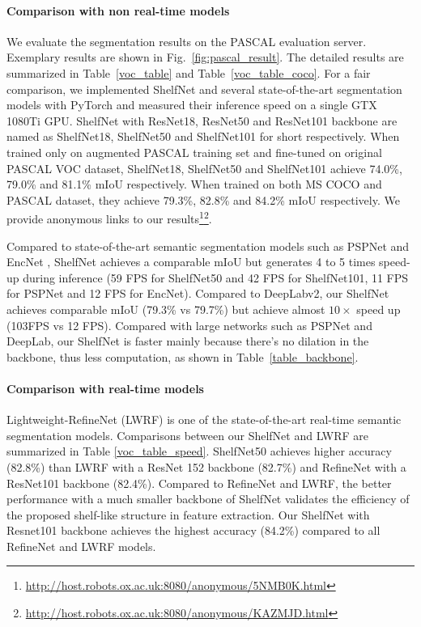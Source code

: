\documentclass[10pt,twocolumn,letterpaper]{article}
\begin{document}
\paragraph{Comparison with non real-time models}
We evaluate the segmentation results on the PASCAL evaluation server. Exemplary results are shown in Fig.~\ref{fig:pascal_result}. The detailed results are summarized in Table~\ref{voc_table} and Table~\ref{voc_table_coco}. For a fair comparison, we implemented ShelfNet and several state-of-the-art segmentation models with PyTorch and measured their inference speed on a single GTX 1080Ti GPU. ShelfNet with ResNet18, ResNet50 and ResNet101 backbone are named as ShelfNet18, ShelfNet50 and ShelfNet101 for short respectively. When trained only on augmented PASCAL training set and fine-tuned on original PASCAL VOC dataset, ShelfNet18, ShelfNet50 and ShelfNet101 achieve 74.0\%, 79.0\% and 81.1\% mIoU respectively. When trained on both MS COCO and PASCAL dataset,  they achieve 79.3\%, 82.8\% and 84.2\% mIoU respectively. We provide anonymous links to our results\footnote{\url{http://host.robots.ox.ac.uk:8080/anonymous/5NMB0K.html}}\footnote{\url{http://host.robots.ox.ac.uk:8080/anonymous/KAZMJD.html}}.

Compared to state-of-the-art semantic segmentation models such as PSPNet \cite{zhao2017pyramid} and EncNet \cite{zhang2018context}, ShelfNet achieves a comparable mIoU but generates 4 to 5 times speed-up during inference (59 FPS for ShelfNet50 and 42 FPS for ShelfNet101, 11 FPS for PSPNet and 12 FPS for EncNet). Compared to DeepLabv2, our ShelfNet achieves comparable mIoU (79.3\% vs 79.7\%) but achieve almost $10\times$ speed up (103FPS vs 12 FPS).  Compared with large networks such as PSPNet and DeepLab, our ShelfNet is faster mainly because there's no dilation in the backbone, thus less computation, as shown in Table~\ref{table_backbone}.

\paragraph{Comparison with real-time models}
Lightweight-RefineNet (LWRF) \cite{nekrasov2018light} is one of the state-of-the-art real-time semantic segmentation models. Comparisons between our ShelfNet and LWRF are summarized in Table \ref{voc_table_speed}. ShelfNet50 achieves higher accuracy (82.8\%) than LWRF with a ResNet 152 backbone (82.7\%) and RefineNet with a ResNet101 backbone (82.4\%). Compared to RefineNet and LWRF, the better performance with a much smaller backbone of ShelfNet validates the efficiency of the proposed shelf-like structure in feature extraction. Our ShelfNet with Resnet101 backbone achieves the highest accuracy (84.2\%) compared to all RefineNet and LWRF models. 
\end{document}
